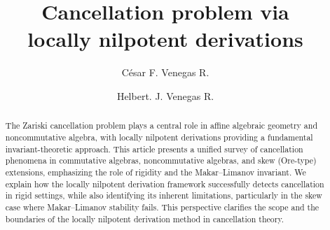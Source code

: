 \documentclass{amsart}
\theoremstyle{plain}
\numberwithin{theorem}{section}
\numberwithin{equation}{theorem}
\theoremstyle{definition}
\begin{document}
\title{Cancellation problem via \\
locally nilpotent derivations}


\author{C\'esar F. Venegas R.}


\address{Venegas C.: Departamento de Matem{\'a}ticas,
Universidad Militar Nueva Granada, Sede Calle 100-Bogot\'a, Colombia}



\author{ Helbert. J. Venegas R.}


\address{Venegas H.: Departamento de Matem{\'a}ticas,
Universidad Militar Nueva Granada, Sede Campus-Cajic\'a, Colombia}




\begin{abstract}
The Zariski cancellation problem plays a central role in affine algebraic geometry and noncommutative algebra, with locally nilpotent derivations providing a fundamental invariant-theoretic approach. This article presents a unified survey of cancellation phenomena in commutative algebras, noncommutative algebras, and skew (Ore-type) extensions, emphasizing the role of rigidity and the Makar--Limanov invariant. We explain how the locally nilpotent derivation framework successfully detects cancellation in rigid settings, while also identifying its inherent limitations, particularly in the skew case where Makar--Limanov stability fails. This perspective clarifies the scope and the boundaries of the locally nilpotent derivation method in cancellation theory.
\end{abstract}









\maketitle
\end{document}
